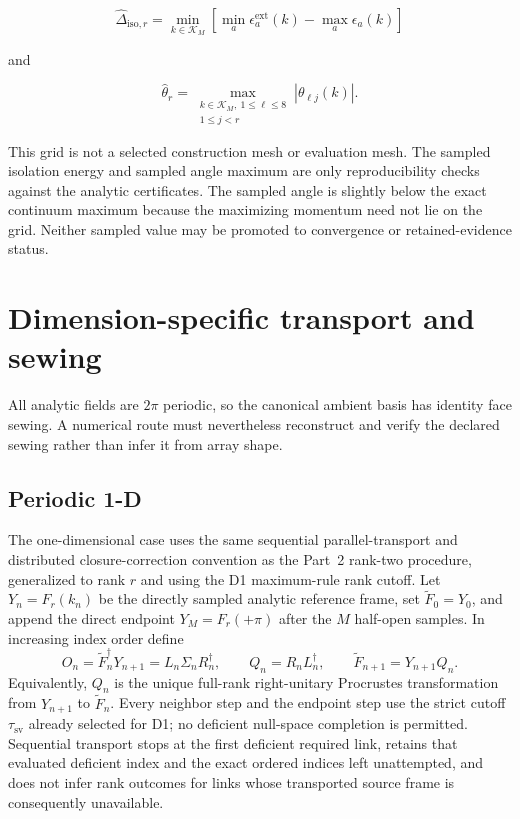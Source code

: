 \documentclass[11pt]{article}
\begin{document}
\[
\widehat\Delta_{\mathrm{iso},r}
=\min_{k\in\mathcal K_M}
\left[\min_a\epsilon_a^{\mathrm{ext}}(k)-\max_a\epsilon_a(k)\right]
\]

and

\[
\widehat\theta_r
=\max_{\substack{k\in\mathcal K_M,\ 1\leq\ell\leq8\\1\leq j<r}}
|\theta_{\ell j}(k)|.
\]

This grid is not a selected construction mesh or evaluation mesh. The sampled isolation
energy and sampled angle maximum are only reproducibility checks against the analytic
certificates. The sampled angle is slightly below the exact continuum maximum because
the maximizing momentum need not lie on the grid. Neither sampled value may be promoted
to convergence or retained-evidence status.

\section{Dimension-specific transport and sewing}

All analytic fields are $2\pi$ periodic, so the canonical ambient basis has identity
face sewing. A numerical route must nevertheless reconstruct and verify the declared
sewing rather than infer it from array shape.

\subsection{Periodic 1-D}

The one-dimensional case uses the same sequential parallel-transport and distributed
closure-correction convention as the Part~2 rank-two procedure, generalized to rank $r$
and using the D1 maximum-rule rank cutoff. Let $Y_n=F_r(k_n)$ be the directly sampled
analytic reference frame, set $\widetilde F_0=Y_0$, and append the direct endpoint
$Y_M=F_r(+\pi)$ after the $M$ half-open samples. In increasing index order define
\[
 O_n=\widetilde F_n^\dagger Y_{n+1}=L_n\Sigma_nR_n^\dagger,
 \qquad Q_n=R_nL_n^\dagger,
 \qquad \widetilde F_{n+1}=Y_{n+1}Q_n .
\]
Equivalently, $Q_n$ is the unique full-rank right-unitary Procrustes transformation from
$Y_{n+1}$ to $\widetilde F_n$. Every neighbor step and the endpoint step use the strict
cutoff $\tau_{\mathrm{sv}}$ already selected for D1; no deficient null-space completion is
permitted. Sequential transport stops at the first deficient required link, retains that
evaluated deficient index and the exact ordered indices left unattempted, and does not
infer rank outcomes for links whose transported source frame is consequently unavailable.
\end{document}
